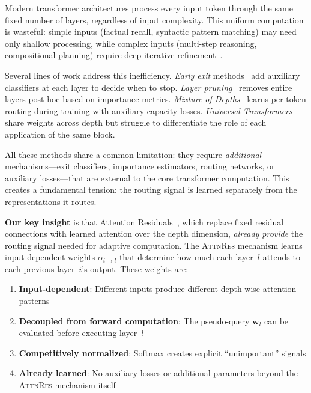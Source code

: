 \documentclass{article}
\newcommand{\attnres}{\textsc{AttnRes}}
\begin{document}
Modern transformer architectures process every input token through the same fixed number of layers, regardless of input complexity. This uniform computation is wasteful: simple inputs (factual recall, syntactic pattern matching) may need only shallow processing, while complex inputs (multi-step reasoning, compositional planning) require deep iterative refinement~\citep{graves2016adaptive, dehghani2018universal}.

Several lines of work address this inefficiency. \textit{Early exit} methods~\citep{schuster2022confident, elbayad2020depth} add auxiliary classifiers at each layer to decide when to stop. \textit{Layer pruning}~\citep{gromov2024unreasonable, men2024shortgpt} removes entire layers post-hoc based on importance metrics. \textit{Mixture-of-Depths}~\citep{raposo2024mixture} learns per-token routing during training with auxiliary capacity losses. \textit{Universal Transformers}~\citep{dehghani2018universal} share weights across depth but struggle to differentiate the role of each application of the same block.

All these methods share a common limitation: they require \emph{additional} mechanisms---exit classifiers, importance estimators, routing networks, or auxiliary losses---that are external to the core transformer computation. This creates a fundamental tension: the routing signal is learned separately from the representations it routes.

\textbf{Our key insight} is that Attention Residuals~\citep{chen2026attnres}, which replace fixed residual connections with learned attention over the depth dimension, \emph{already provide} the routing signal needed for adaptive computation. The \attnres{} mechanism learns input-dependent weights $\alpha_{i \to l}$ that determine how much each layer~$l$ attends to each previous layer~$i$'s output. These weights are:
\begin{enumerate}
    \item \textbf{Input-dependent}: Different inputs produce different depth-wise attention patterns
    \item \textbf{Decoupled from forward computation}: The pseudo-query $\mathbf{w}_l$ can be evaluated before executing layer~$l$
    \item \textbf{Competitively normalized}: Softmax creates explicit ``unimportant'' signals
    \item \textbf{Already learned}: No auxiliary losses or additional parameters beyond the \attnres{} mechanism itself
\end{enumerate}
\end{document}

